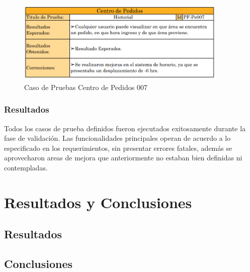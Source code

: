 \documentclass[12pt,letterpaper,spanish]{report}
\begin{document}
\begin{figure}[H]
  \centering
  \includegraphics[width=0.9\textwidth]{PF-Pe007.png}
  \caption{Caso de Pruebas Centro de Pedidos 007}\label{Pe007}
\end{figure}


\subsection{Resultados}
Todos los casos de prueba definidos fueron ejecutados exitosamente durante la fase de validaci\'on. Las funcionalidades principales operan de acuerdo a lo especificado en los requerimientos, sin presentar errores fatales, además se aprovecharon areas de mejora que anteriormente no estaban bien definidas ni contempladas.






\chapter{Resultados y Conclusiones}
\newpage

\section{Resultados}


\section{Conclusiones}



\newpage
\end{document}
